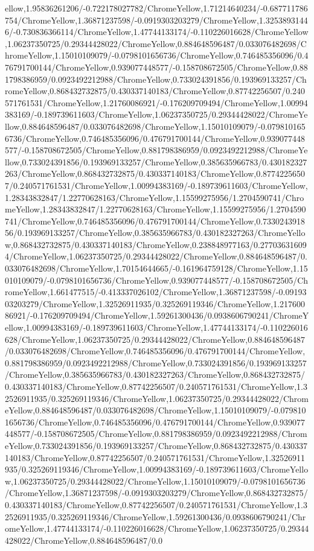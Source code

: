 {\begin{tikzternal}
ellow,1.95836261206/-0.722178027782/ChromeYellow,1.71214640234/-0.687711786754/ChromeYellow,1.36871237598/-0.0919303203279/ChromeYellow,1.32538931446/-0.730836366114/ChromeYellow,1.47744133174/-0.110226016628/ChromeYellow,1.06237350725/0.29344428022/ChromeYellow,0.884648596487/0.033076482698/ChromeYellow,1.15010109079/-0.0798101656736/ChromeYellow,0.746485356096/0.476791700144/ChromeYellow,0.939077448577/-0.158708672505/ChromeYellow,0.881798386959/0.0923492212988/ChromeYellow,0.733024391856/0.193969133257/ChromeYellow,0.868432732875/0.430337140183/ChromeYellow,0.87742256507/0.240571761531/ChromeYellow,1.21760086921/-0.176209709494/ChromeYellow,1.00994383169/-0.189739611603/ChromeYellow,1.06237350725/0.29344428022/ChromeYellow,0.884648596487/0.033076482698/ChromeYellow,1.15010109079/-0.0798101656736/ChromeYellow,0.746485356096/0.476791700144/ChromeYellow,0.939077448577/-0.158708672505/ChromeYellow,0.881798386959/0.0923492212988/ChromeYellow,0.733024391856/0.193969133257/ChromeYellow,0.385635966783/0.430182327263/ChromeYellow,0.868432732875/0.430337140183/ChromeYellow,0.87742256507/0.240571761531/ChromeYellow,1.00994383169/-0.189739611603/ChromeYellow,1.28343832847/1.22770628163/ChromeYellow,1.15599275956/1.2704590741/ChromeYellow,1.28343832847/1.22770628163/ChromeYellow,1.15599275956/1.2704590741/ChromeYellow,0.746485356096/0.476791700144/ChromeYellow,0.733024391856/0.193969133257/ChromeYellow,0.385635966783/0.430182327263/ChromeYellow,0.868432732875/0.430337140183/ChromeYellow,0.238848977163/0.277036316094/ChromeYellow,1.06237350725/0.29344428022/ChromeYellow,0.884648596487/0.033076482698/ChromeYellow,1.70154644665/-0.161964759128/ChromeYellow,1.15010109079/-0.0798101656736/ChromeYellow,0.939077448577/-0.158708672505/ChromeYellow,1.661477515/-0.413337026102/ChromeYellow,1.36871237598/-0.0919303203279/ChromeYellow,1.32526911935/0.325269119346/ChromeYellow,1.21760086921/-0.176209709494/ChromeYellow,1.59261300436/0.0938606790241/ChromeYellow,1.00994383169/-0.189739611603/ChromeYellow,1.47744133174/-0.110226016628/ChromeYellow,1.06237350725/0.29344428022/ChromeYellow,0.884648596487/0.033076482698/ChromeYellow,0.746485356096/0.476791700144/ChromeYellow,0.881798386959/0.0923492212988/ChromeYellow,0.733024391856/0.193969133257/ChromeYellow,0.385635966783/0.430182327263/ChromeYellow,0.868432732875/0.430337140183/ChromeYellow,0.87742256507/0.240571761531/ChromeYellow,1.32526911935/0.325269119346/ChromeYellow,1.06237350725/0.29344428022/ChromeYellow,0.884648596487/0.033076482698/ChromeYellow,1.15010109079/-0.0798101656736/ChromeYellow,0.746485356096/0.476791700144/ChromeYellow,0.939077448577/-0.158708672505/ChromeYellow,0.881798386959/0.0923492212988/ChromeYellow,0.733024391856/0.193969133257/ChromeYellow,0.868432732875/0.430337140183/ChromeYellow,0.87742256507/0.240571761531/ChromeYellow,1.32526911935/0.325269119346/ChromeYellow,1.00994383169/-0.189739611603/ChromeYellow,1.06237350725/0.29344428022/ChromeYellow,1.15010109079/-0.0798101656736/ChromeYellow,1.36871237598/-0.0919303203279/ChromeYellow,0.868432732875/0.430337140183/ChromeYellow,0.87742256507/0.240571761531/ChromeYellow,1.32526911935/0.325269119346/ChromeYellow,1.59261300436/0.0938606790241/ChromeYellow,1.47744133174/-0.110226016628/ChromeYellow,1.06237350725/0.29344428022/ChromeYellow,0.884648596487/0.0
\end{tikzternal}}

